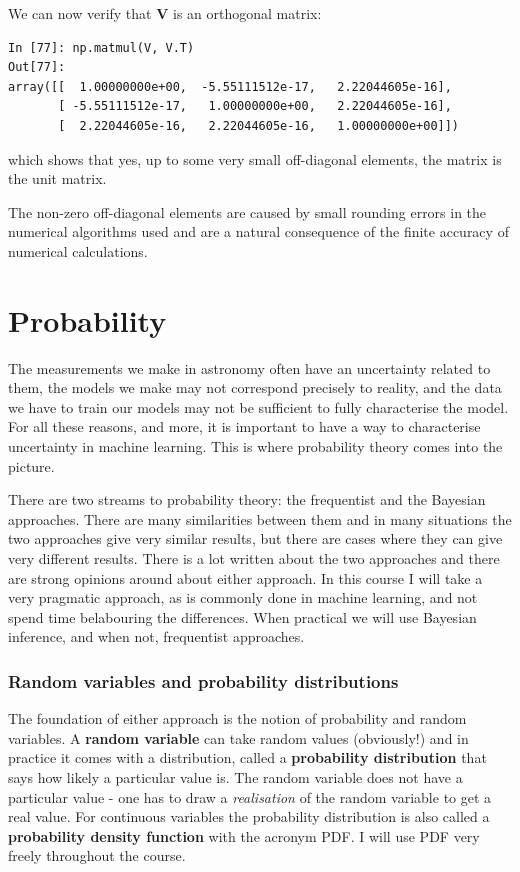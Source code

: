 \documentclass[a4paper,10pt]{article}
\begin{document}
We can now verify that $\mathbf{V}$ is an orthogonal matrix:

\begin{lstlisting}
In [77]: np.matmul(V, V.T)
Out[77]: 
array([[  1.00000000e+00,  -5.55111512e-17,   2.22044605e-16],
       [ -5.55111512e-17,   1.00000000e+00,   2.22044605e-16],
       [  2.22044605e-16,   2.22044605e-16,   1.00000000e+00]])

\end{lstlisting}

which shows that yes, up to some very small off-diagonal elements, the matrix is the unit matrix.

The non-zero off-diagonal elements are caused by small rounding errors in the numerical algorithms used and are a natural consequence of the finite accuracy of numerical calculations.

\section{ Probability}

The measurements we make in astronomy often have an uncertainty related to them,  the models we make may not correspond precisely to reality, and the data we have to train our models may not be sufficient to fully characterise the model. For all these reasons, and more, it is important to have a way to characterise uncertainty in machine learning. This is where probability theory comes into the picture.

There are two streams to probability theory: the frequentist and the Bayesian approaches. There are many similarities between them and in many situations the two approaches give very similar results, but there are cases where they can give very different results. There is a lot written about the two approaches and there are strong opinions around about either approach. In this course I will take a very pragmatic approach, as is commonly done in machine learning, and not spend time belabouring the differences. When practical we will use Bayesian inference, and when not, frequentist approaches.

\subsubsection{ Random variables and probability distributions}
The foundation of either approach is the notion of probability and random variables. A \textbf{random variable} can take random values (obviously!) and in practice it comes with a distribution, called a \textbf{probability distribution} that says how likely a particular value is. The random variable does not have a particular value - one has to draw a \textit{realisation} of the random variable to get a real value. For continuous variables the probability distribution is also called a \textbf{probability density function} with the acronym PDF. I will use PDF very freely throughout the course.
\end{document}

